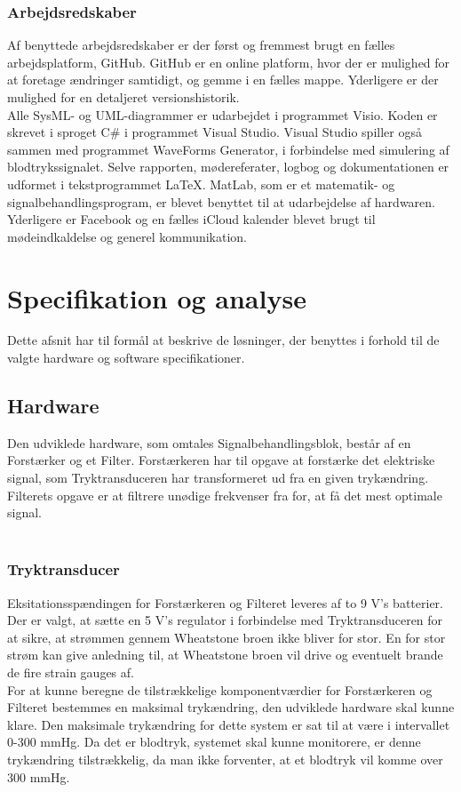 \subsubsection{Arbejdsredskaber} 
Af benyttede arbejdsredskaber er der først og fremmest brugt en fælles arbejdsplatform, GitHub. GitHub er en online platform, hvor der er mulighed for at foretage ændringer samtidigt, og gemme i en fælles mappe. Yderligere er der mulighed for en detaljeret versionshistorik.\\
Alle SysML- og UML-diagrammer er udarbejdet i programmet Visio. Koden er skrevet i sproget C\# i programmet Visual Studio. Visual Studio spiller også sammen med programmet WaveForms Generator, i forbindelse med simulering af blodtrykssignalet. Selve rapporten, mødereferater, logbog og dokumentationen er udformet i tekstprogrammet LaTeX. MatLab, som er et matematik- og signalbehandlingsprogram, er blevet benyttet til at udarbejdelse af hardwaren. Yderligere er Facebook og en fælles iCloud kalender blevet brugt til mødeindkaldelse og generel kommunikation.



\section{Specifikation og analyse}
Dette afsnit har til formål at beskrive de løsninger, der benyttes i forhold til de valgte hardware og software specifikationer. 

\subsection{Hardware}
Den udviklede hardware, som omtales Signalbehandlingsblok, består af en Forstærker og et Filter. Forstærkeren har til opgave at forstærke det elektriske signal, som Tryktransduceren har transformeret ud fra en given trykændring. Filterets opgave er at filtrere unødige frekvenser fra for, at få det mest optimale signal.
\\\\
\subsubsection{Tryktransducer}
Eksitationsspændingen for Forstærkeren og Filteret leveres af to 9 V's batterier. Der er valgt, at sætte en 5 V's regulator i forbindelse med Tryktransduceren for at sikre, at strømmen gennem Wheatstone broen ikke bliver for stor. En for stor strøm kan give anledning til, at Wheatstone broen vil drive og eventuelt brande de fire strain gauges af.\\
For at kunne beregne de tilstrækkelige komponentværdier for Forstærkeren og Filteret bestemmes en maksimal trykændring, den udviklede hardware skal kunne klare. Den maksimale trykændring for dette system er sat til at være i intervallet 0-300 mmHg. Da det er blodtryk, systemet skal kunne monitorere, er denne trykændring tilstrækkelig, da man ikke forventer, at et blodtryk vil komme over 300 mmHg.

